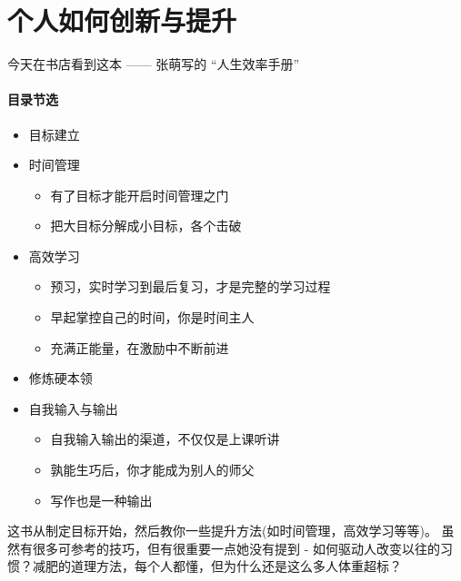 

\chapter{个人如何创新与提升} %


今天在书店看到这本 ------ 张萌写的 ``人生效率手册''

\hypertarget{ux76eeux5f55ux8282ux9009}{%
\subsubsection{目录节选}\label{ux76eeux5f55ux8282ux9009}}

\begin{itemize}
\tightlist
\item
  目标建立
\item
  时间管理

  \begin{itemize}
  \tightlist
  \item
    有了目标才能开启时间管理之门
  \item
    把大目标分解成小目标，各个击破
  \end{itemize}
\item
  高效学习

  \begin{itemize}
  \tightlist
  \item
    预习，实时学习到最后复习，才是完整的学习过程
  \item
    早起掌控自己的时间，你是时间主人
  \item
    充满正能量，在激励中不断前进
  \end{itemize}
\item
  修炼硬本领
\item
  自我输入与输出

  \begin{itemize}
  \tightlist
  \item
    自我输入输出的渠道，不仅仅是上课听讲
  \item
    孰能生巧后，你才能成为别人的师父
  \item
    写作也是一种输出
  \end{itemize}
\end{itemize}

这书从制定目标开始，然后教你一些提升方法(如时间管理，高效学习等等)。
虽然有很多可参考的技巧，但有很重要一点她没有提到 -
如何驱动人改变以往的习惯？减肥的道理方法，每个人都懂，但为什么还是这么多人体重超标？

